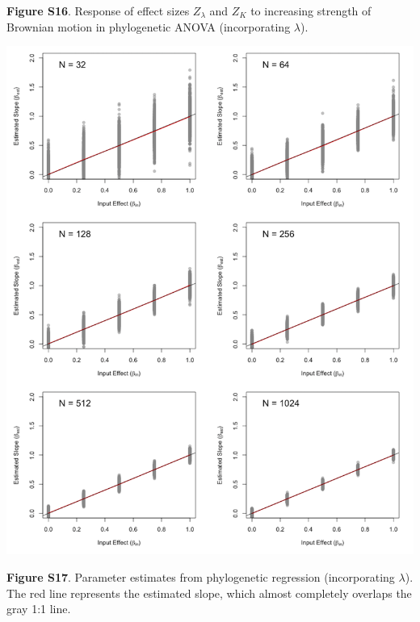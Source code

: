 \documentclass[
]{article}
\begin{document}
\textbf{Figure S16}. Response of effect sizes \(Z_{\lambda}\) and
\(Z_K\) to increasing strength of Brownian motion in phylogenetic ANOVA
(incorporating \(\lambda\)).

\includegraphics[width=0.95\linewidth]{fig.S17}

\textbf{Figure S17}. Parameter estimates from phylogenetic regression
(incorporating \(\lambda\)). The red line represents the estimated
slope, which almost completely overlaps the gray 1:1 line.
\end{document}
